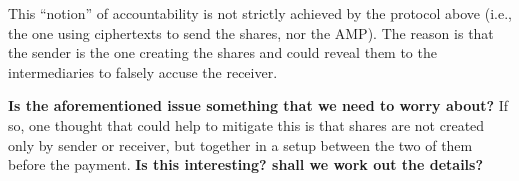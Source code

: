  


This ``notion'' of accountability is not strictly achieved by the protocol above (i.e., the one using ciphertexts to send the shares, nor the AMP). The reason is that the sender is the one creating the shares and could reveal them  to the intermediaries to falsely accuse the receiver. 

\textbf{Is the aforementioned issue something that we need to worry about?}
If so, one thought that could help to mitigate this is that shares are not created only by sender or receiver, but together in a setup between the two of them before the payment. \textbf{Is this interesting? shall we work out the details?} 


